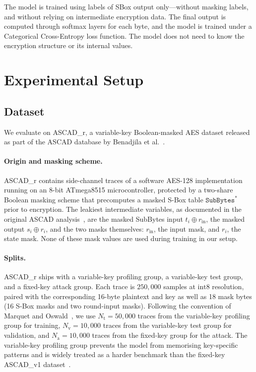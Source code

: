 \documentclass[runningheads]{llncs}
\begin{document}
The model is trained using labels of SBox output only---without masking labels, and without relying on intermediate encryption data.
The final output is computed through softmax layers for each byte, and the model is trained under a Categorical Cross-Entropy loss function.
The model does not need to know the encryption structure or its internal values.


\section{Experimental Setup}\label{sec:setup}

\subsection{Dataset}

We evaluate on ASCAD\_r, a variable-key Boolean-masked AES dataset released as part of the ASCAD database by Benadjila et al.~\cite{benadjila2020deep}.

\paragraph{Origin and masking scheme.}
ASCAD\_r contains side-channel traces of a software AES-128 implementation running on an 8-bit ATmega8515 microcontroller, protected by a two-share Boolean masking scheme that precomputes a masked S-Box table $\mathtt{SubBytes}^{\!*}$ prior to encryption.
The leakiest intermediate variables, as documented in the original ASCAD analysis~\cite{benadjila2020deep}, are the masked SubBytes input $t_i \oplus r_{\mathrm{in}}$, the masked output $s_i \oplus r_i$, and the two masks themselves: $r_{\mathrm{in}}$, the input mask, and $r_i$, the state mask.
None of these mask values are used during training in our setup.

\paragraph{Splits.}
ASCAD\_r ships with a variable-key profiling group, a variable-key test group, and a fixed-key attack group.
Each trace is $250{,}000$ samples at $\mathrm{int}8$ resolution, paired with the corresponding 16-byte plaintext and key as well as 18 mask bytes (16 S-Box masks and two round-input masks).
Following the convention of Marquet and Oswald~\cite{marquet2024exploring}, we use $N_{\mathrm{t}} = 50{,}000$ traces from the variable-key profiling group for training, $N_{\mathrm{v}} = 10{,}000$ traces from the variable-key test group for validation, and $N_{\mathrm{a}} = 10{,}000$ traces from the fixed-key group for the attack.
The variable-key profiling group prevents the model from memorising key-specific patterns and is widely treated as a harder benchmark than the fixed-key ASCAD\_v1 dataset~\cite{poudel2025machine}.
\end{document}
